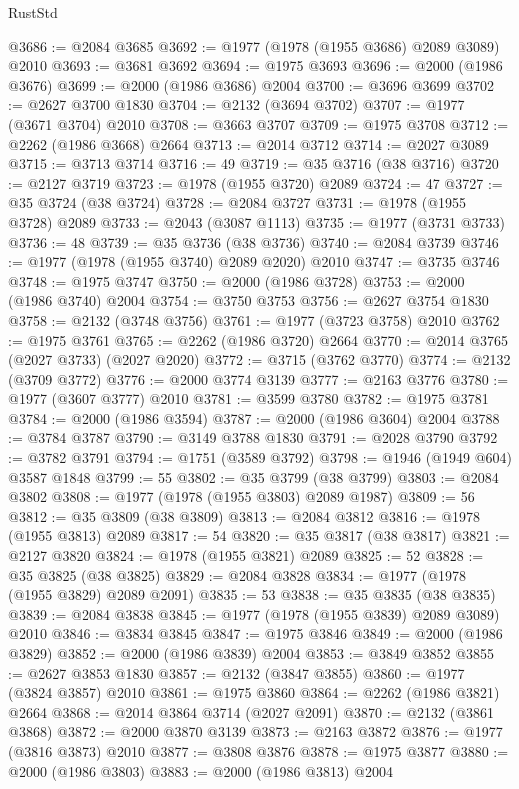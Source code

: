 \begin{lexlean}{RustStd}
\begin{coremodule}
@3686 := @2084 @3685
@3692 := @1977 (@1978 (@1955 @3686) @2089 @3089) @2010
@3693 := @3681 @3692
@3694 := @1975 @3693
@3696 := @2000 (@1986 @3676)
@3699 := @2000 (@1986 @3686) @2004
@3700 := @3696 @3699
@3702 := @2627 @3700 @1830
@3704 := @2132 (@3694 @3702)
@3707 := @1977 (@3671 @3704) @2010
@3708 := @3663 @3707
@3709 := @1975 @3708
@3712 := @2262 (@1986 @3668) @2664
@3713 := @2014 @3712
@3714 := @2027 @3089
@3715 := @3713 @3714
@3716 := 49
@3719 := @35 @3716 (@38 @3716)
@3720 := @2127 @3719
@3723 := @1978 (@1955 @3720) @2089
@3724 := 47
@3727 := @35 @3724 (@38 @3724)
@3728 := @2084 @3727
@3731 := @1978 (@1955 @3728) @2089
@3733 := @2043 (@3087 @1113)
@3735 := @1977 (@3731 @3733)
@3736 := 48
@3739 := @35 @3736 (@38 @3736)
@3740 := @2084 @3739
@3746 := @1977 (@1978 (@1955 @3740) @2089 @2020) @2010
@3747 := @3735 @3746
@3748 := @1975 @3747
@3750 := @2000 (@1986 @3728)
@3753 := @2000 (@1986 @3740) @2004
@3754 := @3750 @3753
@3756 := @2627 @3754 @1830
@3758 := @2132 (@3748 @3756)
@3761 := @1977 (@3723 @3758) @2010
@3762 := @1975 @3761
@3765 := @2262 (@1986 @3720) @2664
@3770 := @2014 @3765 (@2027 @3733) (@2027 @2020)
@3772 := @3715 (@3762 @3770)
@3774 := @2132 (@3709 @3772)
@3776 := @2000 @3774 @3139
@3777 := @2163 @3776
@3780 := @1977 (@3607 @3777) @2010
@3781 := @3599 @3780
@3782 := @1975 @3781
@3784 := @2000 (@1986 @3594)
@3787 := @2000 (@1986 @3604) @2004
@3788 := @3784 @3787
@3790 := @3149 @3788 @1830
@3791 := @2028 @3790
@3792 := @3782 @3791
@3794 := @1751 (@3589 @3792)
@3798 := @1946 (@1949 @604) @3587 @1848
@3799 := 55
@3802 := @35 @3799 (@38 @3799)
@3803 := @2084 @3802
@3808 := @1977 (@1978 (@1955 @3803) @2089 @1987)
@3809 := 56
@3812 := @35 @3809 (@38 @3809)
@3813 := @2084 @3812
@3816 := @1978 (@1955 @3813) @2089
@3817 := 54
@3820 := @35 @3817 (@38 @3817)
@3821 := @2127 @3820
@3824 := @1978 (@1955 @3821) @2089
@3825 := 52
@3828 := @35 @3825 (@38 @3825)
@3829 := @2084 @3828
@3834 := @1977 (@1978 (@1955 @3829) @2089 @2091)
@3835 := 53
@3838 := @35 @3835 (@38 @3835)
@3839 := @2084 @3838
@3845 := @1977 (@1978 (@1955 @3839) @2089 @3089) @2010
@3846 := @3834 @3845
@3847 := @1975 @3846
@3849 := @2000 (@1986 @3829)
@3852 := @2000 (@1986 @3839) @2004
@3853 := @3849 @3852
@3855 := @2627 @3853 @1830
@3857 := @2132 (@3847 @3855)
@3860 := @1977 (@3824 @3857) @2010
@3861 := @1975 @3860
@3864 := @2262 (@1986 @3821) @2664
@3868 := @2014 @3864 @3714 (@2027 @2091)
@3870 := @2132 (@3861 @3868)
@3872 := @2000 @3870 @3139
@3873 := @2163 @3872
@3876 := @1977 (@3816 @3873) @2010
@3877 := @3808 @3876
@3878 := @1975 @3877
@3880 := @2000 (@1986 @3803)
@3883 := @2000 (@1986 @3813) @2004

\end{coremodule}
\end{lexlean}
